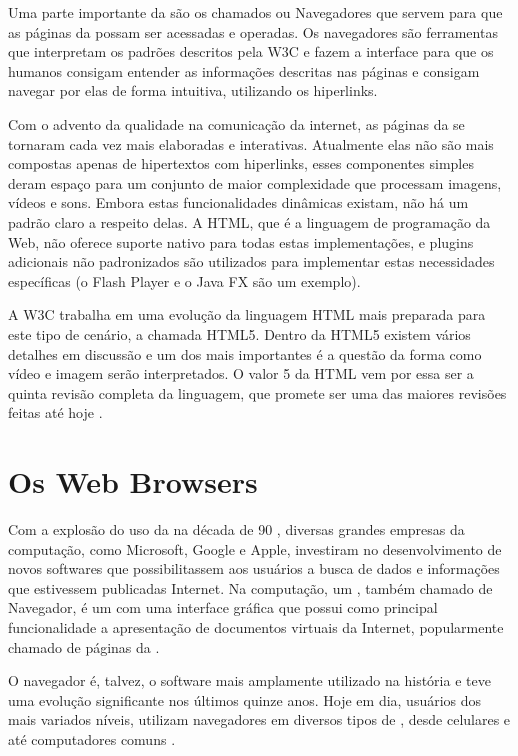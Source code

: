 \documentclass[espaco=simples,appendix=Name]{abnt}
\begin{document}
\begin{description}
Uma parte importante da  são os chamados  ou Navegadores que servem para que as páginas da  possam ser acessadas e operadas. Os navegadores são ferramentas que interpretam os padrões descritos pela W3C e fazem a interface para que os humanos consigam entender as informações descritas nas páginas e consigam navegar por elas de forma intuitiva, utilizando os hiperlinks.

Com o advento da qualidade na comunicação da internet, as páginas da  se tornaram cada vez mais elaboradas e interativas. Atualmente elas não são mais compostas apenas de hipertextos com hiperlinks, esses componentes simples deram espaço para um conjunto de maior complexidade que processam imagens, vídeos e sons. Embora estas funcionalidades dinâmicas existam, não há um padrão claro a respeito delas. A HTML, que é a linguagem de programação da Web, não oferece suporte nativo para todas estas implementações, e plugins adicionais não padronizados são utilizados para implementar estas necessidades específicas (o Flash Player e o Java FX são um exemplo).

A W3C trabalha em uma evolução da linguagem HTML mais preparada para este tipo de cenário, a chamada HTML5. Dentro da HTML5 existem vários detalhes em discussão e um dos mais importantes é a questão da forma como vídeo e imagem serão interpretados. O valor 5 da HTML vem por essa ser a quinta revisão completa da linguagem, que promete ser uma das maiores revisões feitas até hoje \cite{HTML5spec}.

\section{Os Web Browsers}

\item \noindent 

Com a explosão do uso da  na década de 90 \cite{BloombergGameChangers}, diversas grandes empresas da computação, como Microsoft, Google e Apple, investiram no desenvolvimento de novos softwares que possibilitassem aos usuários a busca de dados e informações que estivessem publicadas Internet. Na computação, um , também chamado de Navegador, é um  com uma interface gráfica que possui como principal funcionalidade a apresentação de documentos virtuais da Internet, popularmente chamado de páginas da .

O navegador é, talvez, o software mais amplamente utilizado na história e teve uma evolução significante nos últimos quinze anos. Hoje em dia, usuários dos mais variados níveis, utilizam navegadores em diversos tipos de , desde celulares e  até computadores comuns \cite{ArchitectureWebBrowsers}.


\end{description}
\end{document}
